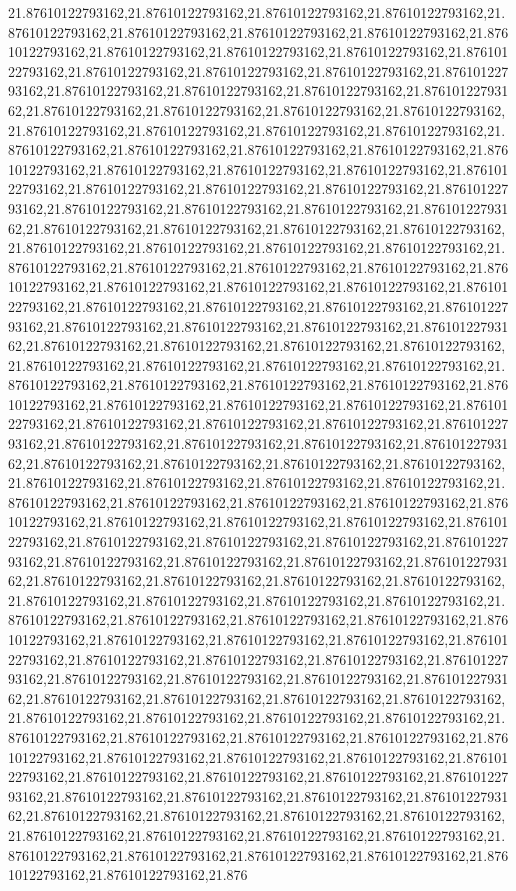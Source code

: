 21.87610122793162,21.87610122793162,21.87610122793162,21.87610122793162,21.87610122793162,21.87610122793162,21.87610122793162,21.87610122793162,21.87610122793162,21.87610122793162,21.87610122793162,21.87610122793162,21.87610122793162,21.87610122793162,21.87610122793162,21.87610122793162,21.87610122793162,21.87610122793162,21.87610122793162,21.87610122793162,21.87610122793162,21.87610122793162,21.87610122793162,21.87610122793162,21.87610122793162,21.87610122793162,21.87610122793162,21.87610122793162,21.87610122793162,21.87610122793162,21.87610122793162,21.87610122793162,21.87610122793162,21.87610122793162,21.87610122793162,21.87610122793162,21.87610122793162,21.87610122793162,21.87610122793162,21.87610122793162,21.87610122793162,21.87610122793162,21.87610122793162,21.87610122793162,21.87610122793162,21.87610122793162,21.87610122793162,21.87610122793162,21.87610122793162,21.87610122793162,21.87610122793162,21.87610122793162,21.87610122793162,21.87610122793162,21.87610122793162,21.87610122793162,21.87610122793162,21.87610122793162,21.87610122793162,21.87610122793162,21.87610122793162,21.87610122793162,21.87610122793162,21.87610122793162,21.87610122793162,21.87610122793162,21.87610122793162,21.87610122793162,21.87610122793162,21.87610122793162,21.87610122793162,21.87610122793162,21.87610122793162,21.87610122793162,21.87610122793162,21.87610122793162,21.87610122793162,21.87610122793162,21.87610122793162,21.87610122793162,21.87610122793162,21.87610122793162,21.87610122793162,21.87610122793162,21.87610122793162,21.87610122793162,21.87610122793162,21.87610122793162,21.87610122793162,21.87610122793162,21.87610122793162,21.87610122793162,21.87610122793162,21.87610122793162,21.87610122793162,21.87610122793162,21.87610122793162,21.87610122793162,21.87610122793162,21.87610122793162,21.87610122793162,21.87610122793162,21.87610122793162,21.87610122793162,21.87610122793162,21.87610122793162,21.87610122793162,21.87610122793162,21.87610122793162,21.87610122793162,21.87610122793162,21.87610122793162,21.87610122793162,21.87610122793162,21.87610122793162,21.87610122793162,21.87610122793162,21.87610122793162,21.87610122793162,21.87610122793162,21.87610122793162,21.87610122793162,21.87610122793162,21.87610122793162,21.87610122793162,21.87610122793162,21.87610122793162,21.87610122793162,21.87610122793162,21.87610122793162,21.87610122793162,21.87610122793162,21.87610122793162,21.87610122793162,21.87610122793162,21.87610122793162,21.87610122793162,21.87610122793162,21.87610122793162,21.87610122793162,21.87610122793162,21.87610122793162,21.87610122793162,21.87610122793162,21.87610122793162,21.87610122793162,21.87610122793162,21.87610122793162,21.87610122793162,21.87610122793162,21.87610122793162,21.87610122793162,21.87610122793162,21.87610122793162,21.87610122793162,21.87610122793162,21.87610122793162,21.87610122793162,21.87610122793162,21.87610122793162,21.87610122793162,21.87610122793162,21.87610122793162,21.87610122793162,21.87610122793162,21.87610122793162,21.87610122793162,21.87610122793162,21.87610122793162,21.87610122793162,21.87610122793162,21.87610122793162,21.87610122793162,21.87610122793162,21.87610122793162,21.87610122793162,21.87610122793162,21.87610122793162,21.87610122793162,21.87610122793162,21.87610122793162,21.87610122793162,21.87610122793162,21.87610122793162,21.87610122793162,21.876